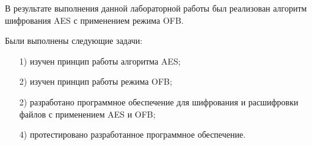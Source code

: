 \documentclass{bmstu}
\begin{document}
В результате выполнения данной лабораторной работы был реализован алгоритм шифрования AES с применением режима OFB.

Были выполнены следующие задачи:
\begin{enumerate}
\item[1)] изучен принцип работы алгоритма AES;
\item[2)] изучен принцип работы режима OFB;
\item[2)] разработано программное обеспечение для шифрования и расшифровки файлов с применением AES и OFB;
\item[4)] протестировано разработанное программное обеспечение.
\end{enumerate}

{\centering \printbibliography[title=СПИСОК ИСПОЛЬЗОВАННЫХ ИСТОЧНИКОВ,heading=bibintoc]}
\end{document}
